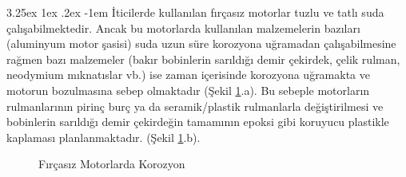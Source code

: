 \documentclass[12pt]{article}
\makeatletter
\renewcommand\paragraph{\@startsection{paragraph}{5}{\z@}%
  {3.25ex \@plus1ex \@minus.2ex}%
  {-1em}%
  {\normalfont\normalsize\bfseries}}
\makeatother
\begin{document}
\paragraph{} İticilerde kullanılan fırçasız motorlar tuzlu ve tatlı suda çalışabilmektedir. Ancak bu motorlarda kullanılan malzemelerin bazıları (aluminyum motor şasisi) suda uzun süre korozyona uğramadan çalışabilmesine rağmen bazı malzemeler (bakır bobinlerin sarıldığı demir çekirdek, çelik rulman, neodymium mıknatıslar vb.) ise zaman içerisinde korozyona uğramakta ve motorun bozulmasına sebep olmaktadır (Şekil \ref{fig:korozyon}.a). Bu sebeple motorların rulmanlarının pirinç burç ya da seramik/plastik rulmanlarla değiştirilmesi ve bobinlerin sarıldığı demir çekirdeğin tamamının epoksi gibi koruyucu plastikle kaplaması planlanmaktadır. (Şekil \ref{fig:korozyon}.b). 

\vspace{-0.5cm}
\begin{figure}[hbt!]%
    \centering
    \qquad
    \caption{Fırçasız Motorlarda Korozyon}%
    \label{fig:korozyon}%
\end{figure}

\end{document}

